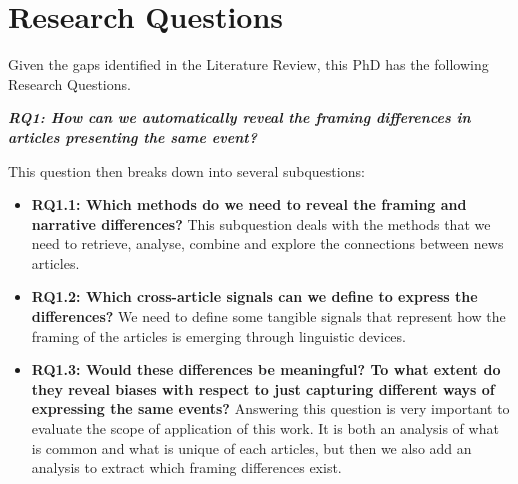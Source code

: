 \chapter{Research Questions}
\label{chap:research_questions}


Given the gaps identified in the Literature Review, this PhD has the following Research Questions.

\vspace{12px}

\textit{\textbf{RQ1: How can we automatically reveal the framing differences in articles presenting the same event?}}

\vspace{12px}

This question then breaks down into several subquestions:

\begin{itemize}
    \item \textbf{RQ1.1: Which methods do we need to reveal the framing and narrative differences?} This subquestion deals with the methods that we need to retrieve, analyse, combine and explore the connections between news articles. %
    
    \item \textbf{RQ1.2: Which cross-article signals can we define to express the differences?} We need to define some tangible signals that represent how the framing of the articles is emerging through linguistic devices. %
    
    
    \item \textbf{RQ1.3: Would these differences be meaningful? To what extent do they reveal biases with respect to just capturing different ways of expressing the same events?} Answering this question is very important to evaluate the scope of application of this work. It is both an analysis of what is common and what is unique of each articles, but then we also add an analysis to extract which framing differences exist. %
    
\end{itemize}



